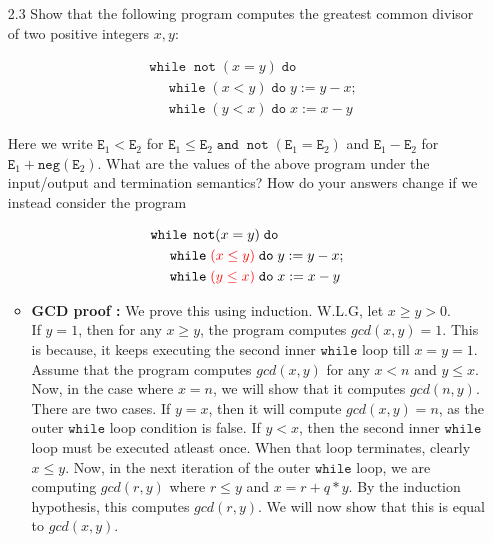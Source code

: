 \documentclass{article}
\newcommand{\E}{\mathtt{E}}
\newcommand{\andsym}{\mathtt{and}}
\newcommand{\notsym}{\mathop{\mathtt{not}}}
\newcommand{\whilesym}{\mathtt{while}}
\newcommand{\dosym}{\mathtt{do}}
\newcommand{\negation}{\mathtt{neg}}
\newcommand{\question}[1]
{\color{DarkBlue}#1 \color{Black}}
\begin{document}
\begin{enumerate}
\begin{enumerate}
\end{enumerate}


\question{
\item[2.3] Show that the following program computes the greatest common divisor of two positive integers $x,y$:

\begin{align*}
& \whilesym \; \notsym(x = y) \; \dosym \\
& \;\;\;\;\; \whilesym \; (x < y) \; \dosym \; y := y - x; \\
& \;\;\;\;\; \whilesym \; (y < x) \; \dosym \; x := x - y
\end{align*}

Here we write $\E_1 < \E_2$ for $\E_1 \leq \E_2 \; \andsym \; \notsym(\E_1 = \E_2)$ and $\E_1 - \E_2$ for $\E_1 + \negation(\E_2)$. 
What are the values of the above program under the input/output and termination semantics? 
How do your answers change if we instead consider the program

\begin{align*}
& \whilesym \; \notsym(x = y) \; \dosym \\
& \;\;\;\;\; \whilesym \; {\color{red} (x \leq y)} \; \dosym \; y := y - x; \\
& \;\;\;\;\; \whilesym \; {\color{red} (y \leq x)} \; \dosym \; x := x - y
\end{align*}
}

\begin{itemize}
  
\item \textbf{GCD proof :}
We prove this using induction. W.L.G, let $x \geq y > 0$. \\

If $y = 1$, then for any $x \geq y$, the program computes $gcd(x, y) = 1$.
This is because, it keeps executing the second inner $\whilesym$ loop till
$x = y = 1$.\\

Assume that the program computes $gcd(x, y)$ for any $x < n$ and $y \leq x$.\\

Now, in the case where $x = n$, we will show that it computes $gcd(n, y)$. 
There are two cases. If $y = x$, then it will compute $gcd(x, y) = n$, 
as the outer $\whilesym$ loop condition is false.
If $y < x$, then the second inner $\whilesym$ loop must be executed
atleast once. When that loop terminates, clearly $x \leq y$. 
Now, in the next iteration of the outer $\whilesym$ loop, we are computing
$gcd(r, y)$ where $r \leq y$ and $x = r + q * y$. 
By the induction hypothesis, this computes $gcd(r, y)$. We will now show that
this is equal to $gcd(x, y)$.\\


\end{itemize}
\end{enumerate}
\end{document}
